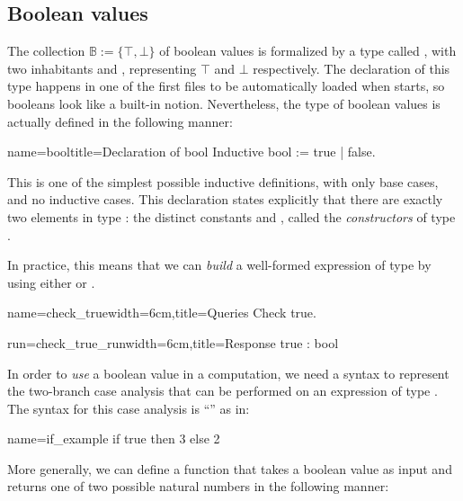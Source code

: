 \subsection{Boolean values}\label{ssec:boolval}

The collection $\mathbb{B} := \{\top, \bot\}$ of boolean values is
formalized by a type called , with two inhabitants 
and , representing $\top$ and $\bot$ respectively. The
declaration of this type happens
in one of the first files to be automatically loaded when \Coq{} starts,
so booleans look like a built-in notion.  Nevertheless, the type of
boolean values is actually defined in the following manner:

\begin{coq}{name=bool}{title=Declaration of bool}
Inductive bool := true | false.
\end{coq}

This is one of the simplest possible inductive definitions,
with only base cases, and no inductive cases. This
declaration states explicitly that there are exactly two
elements in type : the distinct constants  and ,
called the \emph{constructors} of type .



In practice, this means that we can \emph{build} a well-formed expression of
type  by using either  or .

\begin{coq-left}{name=check_true}{width=6cm,title=Queries}
Check true.
\end{coq-left}
\begin{coqout-right}{run=check_true_run}{width=6cm,title=Response}
true : bool
\end{coqout-right}

In order to \emph{use} a boolean value in a computation, we need a
syntax to represent the two-branch case analysis that can be performed
on an expression of type . The \Coq{} syntax for this case analysis is
``'' as in:

\begin{coq}{name=if_example}{}
if true then 3 else 2
\end{coq}
More generally, we can define a function that takes a boolean value as
input and returns one of two possible natural numbers in the following
manner:

